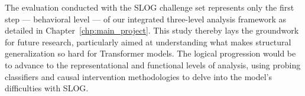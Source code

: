The evaluation conducted with the SLOG challenge set represents only the first step --- behavioral level --- of our integrated three-level analysis framework as detailed in Chapter~\ref{chp:main_project}. This study thereby lays the groundwork for future research, particularly aimed at understanding what makes structural generalization so hard for Transformer models. The logical progression would be to advance to the representational and functional levels of analysis, using probing classifiers and causal intervention methodologies to delve into the model's difficulties with SLOG. 

\stopcontents[chapters]